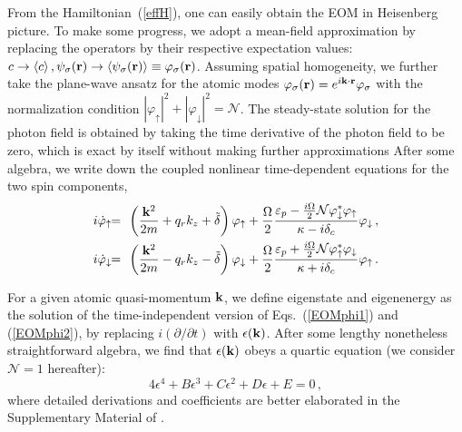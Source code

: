 \documentclass[atoms,article,submit,moreauthors,pdftex,12pt,a4paper]{mdpi}
\def\ba{\begin{eqnarray}}
\def\ea{\end{eqnarray}}
\begin{document}
From the Hamiltonian~(\ref{effH}), one can easily obtain the EOM in Heisenberg picture. To make some progress, we adopt a mean-field approximation by replacing the operators by their respective expectation values: $c \rightarrow \langle c \rangle \,, \psi_\sigma ({\bf r}) \rightarrow \langle \psi_\sigma ({\bf r}) \rangle \equiv \varphi_\sigma ({\bf r})$. 
Assuming spatial homogeneity, we further take the plane-wave ansatz for the atomic modes $\varphi_\sigma({\bf r})=e^{i{\bf k}\cdot{\bf r}}\varphi_\sigma$ with the normalization condition $|\varphi_\uparrow|^2+|\varphi_\downarrow|^2=\mathcal{N}$. The steady-state solution for the photon field is obtained by taking the time derivative of the photon field to be zero, which is exact by itself without making further approximations %
After some algebra, we write down the coupled nonlinear time-dependent equations for the two spin components, 
\ba
i\dot{\varphi}_{\uparrow}&\!\! =\!\! & \left(\frac{{\bf k}^{2}}{2m}+q_{r}k_{z}+\tilde{\delta}\right) \varphi_{\uparrow}+\frac{\Omega}{2}\frac{\varepsilon_{p}-\frac{i\Omega}{2} \mathcal{N}\varphi_\downarrow^\ast\varphi_\uparrow}{\kappa-i\delta_{c}}\varphi_{\downarrow} \,,\label{EOMphi1}\\
i\dot{\varphi}_{\downarrow} & \!\!= \!\!& \left(\frac{{\bf k}^{2}}{2m}-q_{r}k_{z}-\tilde{\delta}\right)\varphi_{\downarrow}+\frac{\Omega}{2}\frac{\varepsilon_{p}+\frac{i\Omega}{2} \mathcal{N}\varphi_\uparrow^\ast\varphi_\downarrow}{\kappa+i\delta_{c}}\varphi_{\uparrow}\,.\label{EOMphi2}
\ea

For a given atomic quasi-momentum ${\bf k}$, we define eigenstate and eigenenergy as the solution of the time-independent version of Eqs.~(\ref{EOMphi1}) and (\ref{EOMphi2}),  by replacing $i(\partial/\partial t)$ with $\epsilon({\bf k})$. After some lengthy nonetheless straightforward algebra, we find that $\epsilon({\bf k})$ obeys a quartic equation (we consider $\mathcal{N}=1$ hereafter): 
\begin{equation}
4\epsilon^4+B\epsilon^3+C\epsilon^2+D\epsilon+E=0 \,,
\label{generalquarticEq}
\end{equation}
where detailed derivations and coefficients are better elaborated in the Supplementary Material of \cite{cavitySOC}. 
\end{document}
